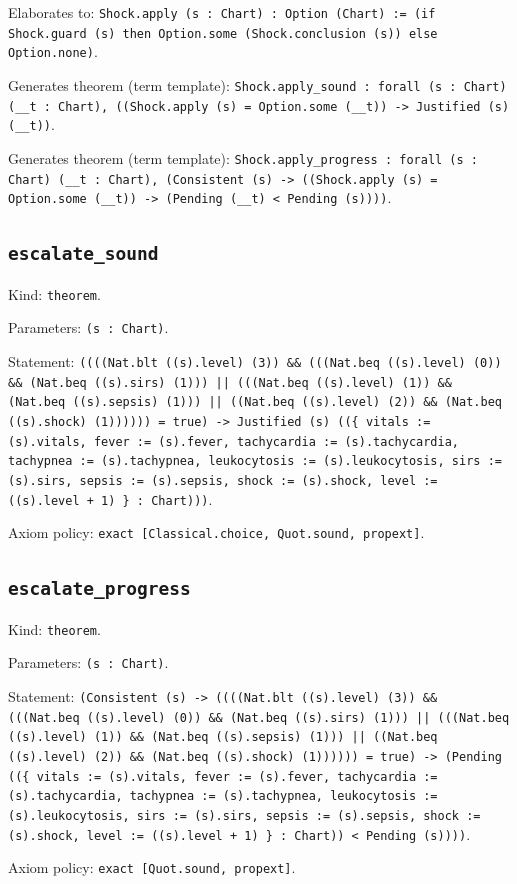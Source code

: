 \documentclass[11pt]{article}
\begin{document}
\noindent Elaborates to: \texttt{Shock.apply (s : Chart) : Option (Chart) := (if Shock.guard (s) then Option.some (Shock.conclusion (s)) else Option.none)}.\par
\noindent Generates theorem (term template): \texttt{Shock.apply\_sound : forall (s : Chart) (\_\_t : Chart), ((Shock.apply (s) = Option.some (\_\_t)) -> Justified (s) (\_\_t))}.\par
\noindent Generates theorem (term template): \texttt{Shock.apply\_progress : forall (s : Chart) (\_\_t : Chart), (Consistent (s) -> ((Shock.apply (s) = Option.some (\_\_t)) -> (Pending (\_\_t) < Pending (s))))}.\par
\subsection*{\texttt{escalate\_sound}}
\noindent Kind: \texttt{theorem}.\par
\noindent Parameters: \texttt{(s : Chart)}.\par
\noindent Statement: \texttt{((((Nat.blt ((s).level) (3)) \&\& (((Nat.beq ((s).level) (0)) \&\& (Nat.beq ((s).sirs) (1))) || (((Nat.beq ((s).level) (1)) \&\& (Nat.beq ((s).sepsis) (1))) || ((Nat.beq ((s).level) (2)) \&\& (Nat.beq ((s).shock) (1)))))) = true) -> Justified (s) ((\{ vitals := (s).vitals, fever := (s).fever, tachycardia := (s).tachycardia, tachypnea := (s).tachypnea, leukocytosis := (s).leukocytosis, sirs := (s).sirs, sepsis := (s).sepsis, shock := (s).shock, level := ((s).level + 1) \} : Chart)))}.\par
\noindent Axiom policy: \texttt{exact [Classical.choice, Quot.sound, propext]}.\par
\subsection*{\texttt{escalate\_progress}}
\noindent Kind: \texttt{theorem}.\par
\noindent Parameters: \texttt{(s : Chart)}.\par
\noindent Statement: \texttt{(Consistent (s) -> ((((Nat.blt ((s).level) (3)) \&\& (((Nat.beq ((s).level) (0)) \&\& (Nat.beq ((s).sirs) (1))) || (((Nat.beq ((s).level) (1)) \&\& (Nat.beq ((s).sepsis) (1))) || ((Nat.beq ((s).level) (2)) \&\& (Nat.beq ((s).shock) (1)))))) = true) -> (Pending ((\{ vitals := (s).vitals, fever := (s).fever, tachycardia := (s).tachycardia, tachypnea := (s).tachypnea, leukocytosis := (s).leukocytosis, sirs := (s).sirs, sepsis := (s).sepsis, shock := (s).shock, level := ((s).level + 1) \} : Chart)) < Pending (s))))}.\par
\noindent Axiom policy: \texttt{exact [Quot.sound, propext]}.\par
\end{document}
